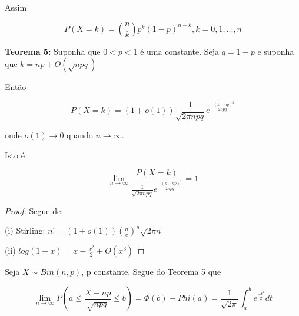 Assim

\[P(X=k)={n\choose k}p^k(1-p)^{n-k}, k = 0,1,...,n \]

\textbf{Teorema 5:} Suponha que $0<p<1$ é uma constante. Seja $q = 1-p$ e suponha que $k = np + O(\sqrt{npq})$

Então

\[P(X=k) = (1+o(1))\frac{1}{\sqrt{2\pi npq}}e^{\frac{-(k-np)^2}{2npq}}\]

onde $o(1)\to 0$ quando $n \to\infty$.

Isto é

\[\lim_{n\to\infty} \frac{P(X=k)}{\frac{1}{\sqrt{2\pi npq}}e^{\frac{-(k-np)^2}{2npq}}} = 1\]

\begin{proof}
Segue de:

(i) Stirling: $n! = (1+o(1))(\frac{n}{e})^n\sqrt{2\pi n}$

(ii) $log(1+x) = x - \frac{x^2}{2} + O(x^3)$
\end{proof}

Seja $X\sim Bin(n,p)$, p constante. Segue do Teorema 5 que

\[
\lim_{n\to\infty} P(a\leq \frac{X-np}{\sqrt{npq}}\leq b) = \Phi (b) - Phi (a) = \frac{1}{\sqrt{2\pi}}\int_{a}^b e^{\frac{-t^2}{2}}dt
\]

